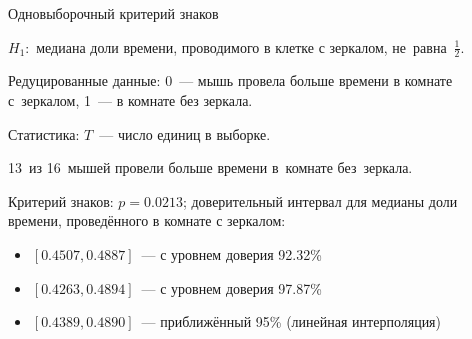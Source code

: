 \documentclass[9pt,pdf,utf8,hyperref={unicode},aspectratio=169]{beamer}
\begin{document}
\begin{frame}[label=signtest1]{\hyperlink{classification}{} Одновыборочный критерий знаков}
{   $H_1\colon$ медиана доли времени, проводимого в клетке с зеркалом, не~равна~$\frac{1}{2}.$
    	
   \bigskip
    	
   Редуцированные данные: 0~--- мышь провела больше времени в комнате с~зеркалом, 1~--- в комнате без зеркала.
    	
   Статистика: $T$~--- число единиц в выборке.
    	
   \bigskip
    	
   13~из 16~мышей провели больше времени в~комнате без~зеркала.
    	
   \bigskip
    	
   Критерий знаков: $p=0.0213$; доверительный интервал для медианы доли времени, проведённого в комнате с зеркалом:
 \begin{itemize}
	 \item $\left[0.4507, 0.4887\right]$~--- с уровнем доверия 92.32\% 
	 \item $\left[0.4263, 0.4894\right]$~--- с уровнем доверия 97.87\% 
     \item  $\left[0.4389, 0.4890\right]$~--- приближённый 95\% (линейная интерполяция)
 \end{itemize} 
   }
\end{frame}
\end{document}
